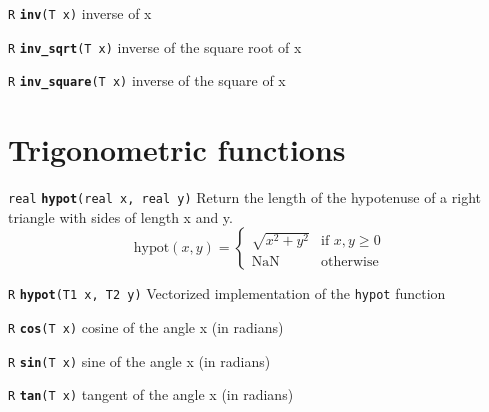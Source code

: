 \documentclass[
  10pt,
]{book}
\begin{document}
\texttt{R} \textbf{\texttt{inv}}\texttt{(T\ x)}\newline
inverse of x


\texttt{R} \textbf{\texttt{inv\_sqrt}}\texttt{(T\ x)}\newline
inverse of the square root of x


\texttt{R} \textbf{\texttt{inv\_square}}\texttt{(T\ x)}\newline
inverse of the square of x

\hypertarget{trigonometric-functions}{%
\section{Trigonometric functions}\label{trigonometric-functions}}


\texttt{real} \textbf{\texttt{hypot}}\texttt{(real\ x,\ real\ y)}\newline
Return the length of the hypotenuse of a right triangle with sides of
length x and y. \[ \text{hypot}(x,y) = \begin{cases} \sqrt{x^2+y^2} &
\text{if } x,y\geq 0 \\ \textrm{NaN} & \text{otherwise} \end{cases} \]


\texttt{R} \textbf{\texttt{hypot}}\texttt{(T1\ x,\ T2\ y)}\newline
Vectorized implementation of the \texttt{hypot} function

\texttt{R} \textbf{\texttt{cos}}\texttt{(T\ x)}\newline
cosine of the angle x (in radians)


\texttt{R} \textbf{\texttt{sin}}\texttt{(T\ x)}\newline
sine of the angle x (in radians)


\texttt{R} \textbf{\texttt{tan}}\texttt{(T\ x)}\newline
tangent of the angle x (in radians)
\end{document}
